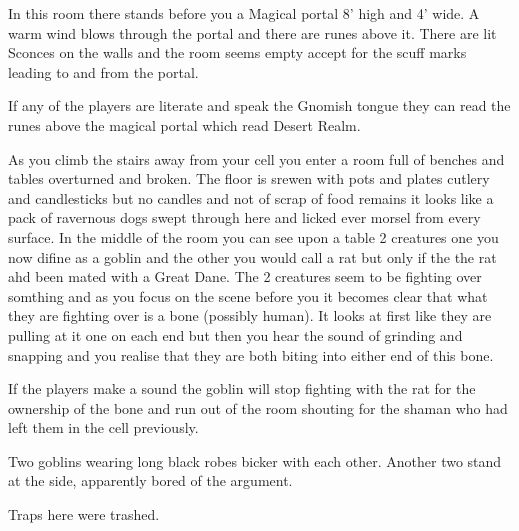 \begin{multicols}{2}
\begin{boxtext}
	In this room there stands before you a Magical portal 8' high and 4' wide.
	A warm wind blows through the portal and there are runes above it.
	There are lit Sconces on the walls and the room seems empty accept for the scuff marks leading to and from the portal. 

\end{boxtext}

If any of the players are literate and speak the Gnomish tongue they can read the runes above the magical portal which read Desert Realm.


\begin{boxtext}
As you climb the stairs away from your cell you enter a room full of benches and tables overturned and broken. 
The floor is srewen with pots and plates cutlery and candlesticks but no candles and not of scrap of food remains it looks like a pack of ravernous dogs swept through here and licked ever morsel from every surface.
In the middle of the room you can see upon a table 2 creatures one you now difine as a goblin and the other you would call a rat but only if the the rat ahd been mated with a Great Dane. 
The 2 creatures seem to be fighting over somthing and as you focus on the scene before you it becomes clear that what they are fighting over is a bone (possibly human).
It looks at first like they are pulling at it one on each end but then you hear the sound of grinding and snapping and you realise that they are both biting into either end of this bone.
\end{boxtext}

If the players make a sound the goblin will stop fighting with the rat for the ownership of the bone and run out of the room shouting for the shaman who had left them in the cell previously.


\begin{boxtext}

	Two goblins wearing long black robes bicker with each other.
	Another two stand at the side, apparently bored of the argument.

\end{boxtext}




Traps here were trashed.


\end{multicols}
